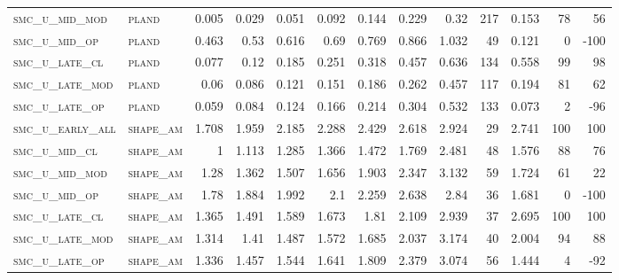 \begin{landscape}
\begin{center}
\begin{footnotesize}
\begin{longtable}{llrrrrrrrr|rrr}
\textsc{smc\_u\_mid\_mod  } & \textsc{pland     }   & 0.005    & 0.029    & 0.051    & 0.092    & 0.144    & 0.229    & 0.32      & 217    & 0.153         & 78            & 56              \\
\textsc{smc\_u\_mid\_op   } & \textsc{pland     }   & 0.463    & 0.53     & 0.616    & 0.69     & 0.769    & 0.866    & 1.032     & 49     & 0.121         & 0             & -100            \\
\textsc{smc\_u\_late\_cl  } & \textsc{pland     }   & 0.077    & 0.12     & 0.185    & 0.251    & 0.318    & 0.457    & 0.636     & 134    & 0.558         & 99            & 98              \\
\textsc{smc\_u\_late\_mod } & \textsc{pland     }   & 0.06     & 0.086    & 0.121    & 0.151    & 0.186    & 0.262    & 0.457     & 117    & 0.194         & 81            & 62              \\
\textsc{smc\_u\_late\_op  } & \textsc{pland     }   & 0.059    & 0.084    & 0.124    & 0.166    & 0.214    & 0.304    & 0.532     & 133    & 0.073         & 2             & -96             \\
\textsc{smc\_u\_early\_all} & \textsc{shape\_am }   & 1.708    & 1.959    & 2.185    & 2.288    & 2.429    & 2.618    & 2.924     & 29     & 2.741         & 100           & 100             \\
\textsc{smc\_u\_mid\_cl   } & \textsc{shape\_am }   & 1        & 1.113    & 1.285    & 1.366    & 1.472    & 1.769    & 2.481     & 48     & 1.576         & 88            & 76              \\
\textsc{smc\_u\_mid\_mod  } & \textsc{shape\_am }   & 1.28     & 1.362    & 1.507    & 1.656    & 1.903    & 2.347    & 3.132     & 59     & 1.724         & 61            & 22              \\
\textsc{smc\_u\_mid\_op   } & \textsc{shape\_am }   & 1.78     & 1.884    & 1.992    & 2.1      & 2.259    & 2.638    & 2.84      & 36     & 1.681         & 0             & -100            \\
\textsc{smc\_u\_late\_cl  } & \textsc{shape\_am }   & 1.365    & 1.491    & 1.589    & 1.673    & 1.81     & 2.109    & 2.939     & 37     & 2.695         & 100           & 100             \\
\textsc{smc\_u\_late\_mod } & \textsc{shape\_am }   & 1.314    & 1.41     & 1.487    & 1.572    & 1.685    & 2.037    & 3.174     & 40     & 2.004         & 94            & 88              \\
\textsc{smc\_u\_late\_op  } & \textsc{shape\_am }   & 1.336    & 1.457    & 1.544    & 1.641    & 1.809    & 2.379    & 3.074     & 56     & 1.444         & 4             & -92             \\

\end{longtable}
\end{footnotesize}
\end{center}
\end{landscape}
